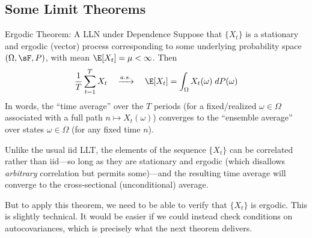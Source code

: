 \documentclass[aspectratio=169, handout]{beamer}
\newcommand{\asto}{\xrightarrow{a.s.}}
\newcommand{\sumtT}{\sum^T_{t=1}}
\begin{document}
\subsection{Some Limit Theorems}



{\footnotesize
\begin{frame}{Ergodic Theorem: A LLN under Dependence}
Suppose that $\{X_t\}$ is a \alert{stationary and ergodic} (vector)
process corresponding to some underlying probability space
$(\Omega,\sF,P)$, with mean $\E[X_t]=\mu<\infty$.
Then
\begin{align*}
  \frac{1}{T}\sumtT X_t
  \quad
  \asto
  \quad
  \E[X_t]
  =\int_\Omega X_t(\omega) \; dP(\omega)
\end{align*}
In words, the ``time average'' over the $T$ periods
(for a fixed/realized $\omega\in\Omega$ associated with a full path
$n\mapsto X_t(\omega)$)
converges to the ``ensemble average'' over states $\omega\in\Omega$
(for any fixed time $n$).

\pause
Unlike the usual iid LLT, the elements of the sequence $\{X_t\}$ can
be \alert{correlated} rather than iid---so long as they are
\alert{stationary} and \alert{ergodic} (which disallows \emph{arbitrary}
correlation but permits some)---and the resulting time average will
converge to the cross-sectional (unconditional) average.

\pause
But to apply this theorem, we need to be able to verify that $\{X_t\}$
is \alert{ergodic}.
This is slightly technical.
It would be easier if we could instead check conditions on
\alert{autocovariances}, which is precisely what the next theorem delivers.
\end{frame}
}
\end{document}
